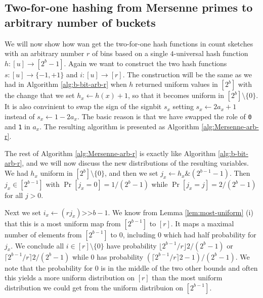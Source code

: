 \documentclass[12pt]{article}
\newcommand{\floor}[1]{\lfloor {#1} \rfloor}
\newcommand\fct\rightarrow
\newcommand\ceil[1]{\lceil {#1}\rceil}
\begin{document}
\subsection{Two-for-one hashing from Mersenne primes to arbitrary number of buckets}
We will now show how wan get the two-for-one hash functions in count
sketches with an arbitrary number $r$ of bins based on a single
$4$-universal hash function $h:[u]\fct [2^b-1]$.  Again we want to
construct the two hash functions $s:[u]\fct\{-1,+1\}$ and
$i:[u]\fct[r]$.  The construction will be the same as we had in
Algorithm \ref{alg:b-bit-arb-r} when $h$ returned uniform values in
$[2^b]$ with the change that we set $h_x\gets h(x)+1$, so that it
becomes uniform in $[2^b]\setminus\{0\}$. It is also convinient to
swap the sign of the signbit $s_x$ setting $s_x\gets 2a_x+1$ instead
of $s_x\gets 1-2a_x$. The basic reason is that we have swapped the
role of \texttt{0} and \texttt{1} in $a_x$.  The resulting algorithm
is presented as Algorithm \ref{alg:Mersenne-arb-r}.
The rest of Algorithm \ref{alg:Mersenne-arb-r} is exactly like 
Algorithm \ref{alg:b-bit-arb-r}, and we will now discuss the new
distributions of the resulting variables. We had
$h_x$ uniform in $[2^b]\setminus\{0\}$, and then we set
$j_x \gets h_x\&(2^{b-1}-1)$. Then $j_x\in[2^{b-1}]$ with 
$\Pr[j_x=0]=1/(2^{b}-1)$ while  $\Pr[j_x=j]=2/(2^{b}-1)$ for all $j>0$.

Next we set $i_x\gets (rj_x)\texttt{>>}b-1$. We know from Lemma
\ref{lem:most-uniform} (i) that this is a most uniform map from
$[2^{b-1}]$ to $[r]$.  It maps a maximal number of elements from
$[2^{b-1}]$ to $0$, including $0$ which had half probability for
$j_x$. We conclude all $i\in[r]\setminus\{0\}$ have probability
$\floor{2^{b-1}/r}2/(2^{b}-1)$ or $\ceil{2^{b-1}/r}2/(2^{b}-1)$ while
$0$ has probability $(\ceil{2^{b-1}/r}2-1)/(2^{b}-1)$. 
We note
that the probability for $0$ is in the middle of the two other
bounds and often this yields a more uniform distribution on $[r]$ than
the most uniform distribution we could get from the
uniform distribuion on $[2^{b-1}]$.
\end{document}
